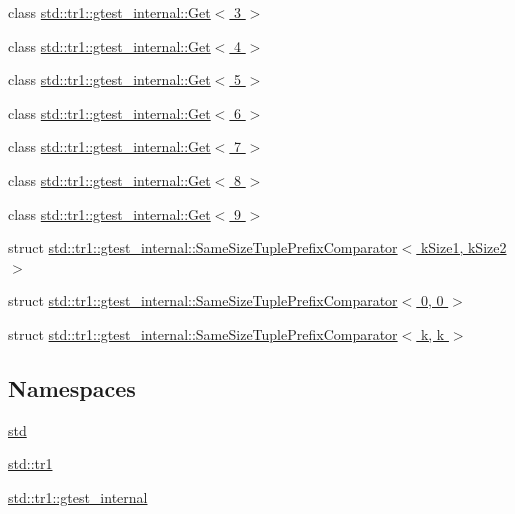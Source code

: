 \begin{DoxyCompactItemize}
\item 
class \hyperlink{classstd_1_1tr1_1_1gtest__internal_1_1Get_3_013_01_4}{std\+::tr1\+::gtest\+\_\+internal\+::\+Get$<$ 3 $>$}
\item 
class \hyperlink{classstd_1_1tr1_1_1gtest__internal_1_1Get_3_014_01_4}{std\+::tr1\+::gtest\+\_\+internal\+::\+Get$<$ 4 $>$}
\item 
class \hyperlink{classstd_1_1tr1_1_1gtest__internal_1_1Get_3_015_01_4}{std\+::tr1\+::gtest\+\_\+internal\+::\+Get$<$ 5 $>$}
\item 
class \hyperlink{classstd_1_1tr1_1_1gtest__internal_1_1Get_3_016_01_4}{std\+::tr1\+::gtest\+\_\+internal\+::\+Get$<$ 6 $>$}
\item 
class \hyperlink{classstd_1_1tr1_1_1gtest__internal_1_1Get_3_017_01_4}{std\+::tr1\+::gtest\+\_\+internal\+::\+Get$<$ 7 $>$}
\item 
class \hyperlink{classstd_1_1tr1_1_1gtest__internal_1_1Get_3_018_01_4}{std\+::tr1\+::gtest\+\_\+internal\+::\+Get$<$ 8 $>$}
\item 
class \hyperlink{classstd_1_1tr1_1_1gtest__internal_1_1Get_3_019_01_4}{std\+::tr1\+::gtest\+\_\+internal\+::\+Get$<$ 9 $>$}
\item 
struct \hyperlink{structstd_1_1tr1_1_1gtest__internal_1_1SameSizeTuplePrefixComparator}{std\+::tr1\+::gtest\+\_\+internal\+::\+Same\+Size\+Tuple\+Prefix\+Comparator$<$ k\+Size1, k\+Size2 $>$}
\item 
struct \hyperlink{structstd_1_1tr1_1_1gtest__internal_1_1SameSizeTuplePrefixComparator_3_010_00_010_01_4}{std\+::tr1\+::gtest\+\_\+internal\+::\+Same\+Size\+Tuple\+Prefix\+Comparator$<$ 0, 0 $>$}
\item 
struct \hyperlink{structstd_1_1tr1_1_1gtest__internal_1_1SameSizeTuplePrefixComparator_3_01k_00_01k_01_4}{std\+::tr1\+::gtest\+\_\+internal\+::\+Same\+Size\+Tuple\+Prefix\+Comparator$<$ k, k $>$}
\end{DoxyCompactItemize}
\subsection*{Namespaces}
\begin{DoxyCompactItemize}
\item 
 \hyperlink{namespacestd}{std}
\item 
 \hyperlink{namespacestd_1_1tr1}{std\+::tr1}
\item 
 \hyperlink{namespacestd_1_1tr1_1_1gtest__internal}{std\+::tr1\+::gtest\+\_\+internal}
\end{DoxyCompactItemize}
